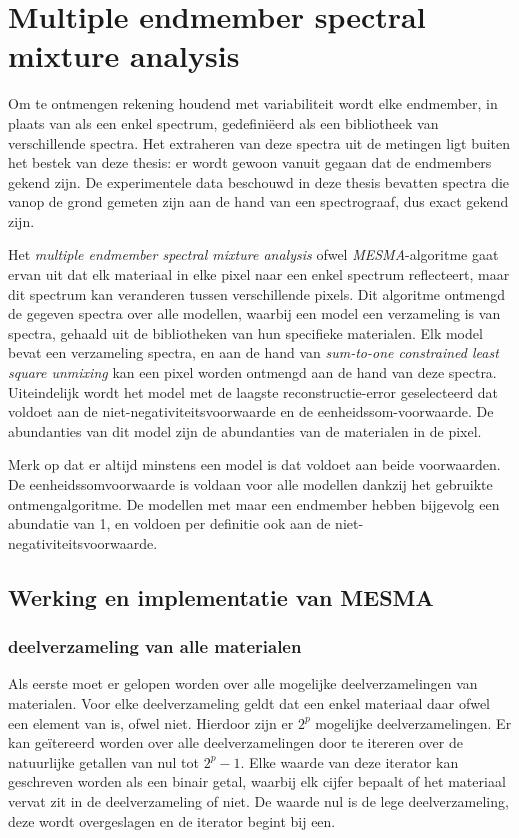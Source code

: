 \documentclass[12pt]{report}
\begin{document}
\section{Multiple endmember spectral mixture analysis} \label{sec:mesma}

Om te ontmengen rekening houdend met variabiliteit wordt elke endmember, in plaats van als een enkel spectrum, gedefini\"eerd als een bibliotheek van verschillende spectra. Het extraheren van deze spectra uit de metingen ligt buiten het bestek van deze thesis: er wordt gewoon vanuit gegaan dat de endmembers gekend zijn. De experimentele data beschouwd in deze thesis bevatten spectra die vanop de grond gemeten zijn aan de hand van een spectrograaf, dus exact gekend zijn.

Het \textit{multiple endmember spectral mixture analysis} ofwel \textit{MESMA}-algoritme gaat ervan uit dat elk materiaal in elke pixel naar een enkel spectrum reflecteert, maar dit spectrum kan veranderen tussen verschillende pixels. Dit algoritme ontmengd de gegeven spectra over alle modellen, waarbij een model een verzameling is van spectra, gehaald uit de bibliotheken van hun specifieke materialen. Elk model bevat een verzameling spectra, en aan de hand van \textit{sum-to-one constrained least square unmixing} kan een pixel worden ontmengd aan de hand van deze spectra. Uiteindelijk wordt het model  met de laagste reconstructie-error geselecteerd dat voldoet aan de niet-negativiteitsvoorwaarde en de eenheidssom-voorwaarde. De abundanties van dit model zijn de abundanties van de materialen in de pixel.

Merk op dat er altijd minstens een model is dat voldoet aan beide voorwaarden. De eenheidssomvoorwaarde is voldaan voor alle modellen dankzij het gebruikte ontmengalgoritme. De modellen met maar een endmember hebben bijgevolg een abundatie van 1, en voldoen per definitie ook aan de niet-negativiteitsvoorwaarde.


\subsection{Werking en implementatie van MESMA}

\subsubsection{deelverzameling van alle materialen}

Als eerste moet er gelopen worden over alle mogelijke deelverzamelingen van materialen. Voor elke deelverzameling geldt dat een enkel materiaal daar ofwel een element van is, ofwel niet. Hierdoor zijn er $2^p$ mogelijke deelverzamelingen. Er kan ge\"itereerd worden over alle deelverzamelingen door te itereren over de natuurlijke getallen van nul tot $2^p-1$. Elke waarde van deze iterator kan geschreven worden als een binair getal, waarbij elk cijfer bepaalt of het materiaal vervat zit in de deelverzameling of niet. De waarde nul is de lege deelverzameling, deze wordt overgeslagen en de iterator begint bij een.
\end{document}
